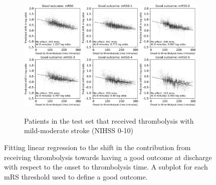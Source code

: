 \begin{figure}[!ht]
\begin{subfigure}[b]{.7
    \textwidth}
      \centering
      \includegraphics[width=1\textwidth]{./images/103_xgb_7_features_1fold_binary_improvement_logodds_bymRSthreshold_sns_6_subplots_nLVO_ivt_shap_paper}\\
      \caption{Patients in the test set that received thrombolysis with mild-moderate stroke (NIHSS 0-10)}
      \label{fig:shap_shift_nlvo}
    \end{subfigure}
    \label{fig:shap_shift}
    \caption{Fitting linear regression to the shift in the contribution from receiving thrombolysis towards having a good outcome at discharge with respect to the onset to thrombolysis time. A subplot for each mRS threshold used to define a good outcome.}
\end{figure}

